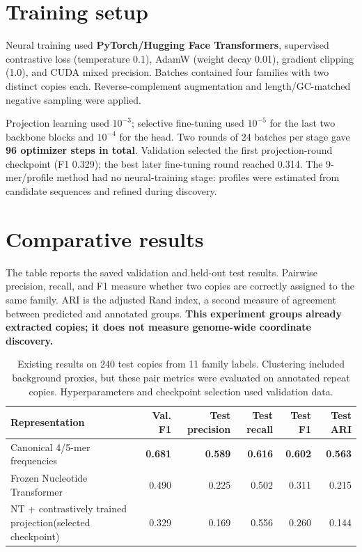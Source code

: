 \documentclass[10pt,a4paper]{article}
\begin{document}
\section*{Training setup}
Neural training used \textbf{PyTorch/Hugging Face Transformers}, supervised contrastive loss (temperature 0.1), AdamW (weight decay 0.01), gradient clipping (1.0), and CUDA mixed precision. Batches contained four families with two distinct copies each. Reverse-complement augmentation and length/GC-matched negative sampling were applied.

Projection learning used $10^{-3}$; selective fine-tuning used $10^{-5}$ for the last two backbone blocks and $10^{-4}$ for the head. Two rounds of 24 batches per stage gave \textbf{96 optimizer steps in total}. Validation selected the first projection-round checkpoint (F1 0.329); the best later fine-tuning round reached 0.314. The 9-mer/profile method had no neural-training stage: profiles were estimated from candidate sequences and refined during discovery.

\section*{Comparative results}
The table reports the saved validation and held-out test results. Pairwise precision, recall, and F1 measure whether two copies are correctly assigned to the same family. ARI is the adjusted Rand index, a second measure of agreement between predicted and annotated groups. \textbf{This experiment groups already extracted copies; it does not measure genome-wide coordinate discovery.}

\begin{table}[!h]
\centering\small
\setlength{\tabcolsep}{5pt}
\begin{tabularx}{\linewidth}{@{}Xrrrrr@{}}
\toprule
Representation & Val. F1 & Test precision & Test recall & Test F1 & Test ARI\\
\midrule
Canonical 4/5-mer frequencies & \textbf{0.681} & \textbf{0.589} & \textbf{0.616} & \textbf{0.602} & \textbf{0.563}\\
Frozen Nucleotide Transformer & 0.490 & 0.225 & 0.502 & 0.311 & 0.215\\
NT + contrastively trained projection\newline (selected checkpoint) & 0.329 & 0.169 & 0.556 & 0.260 & 0.144\\
\bottomrule
\end{tabularx}
\caption{Existing results on 240 test copies from 11 family labels. Clustering included background proxies, but these pair metrics were evaluated on annotated repeat copies. Hyperparameters and checkpoint selection used validation data.}
\end{table}
\end{document}
